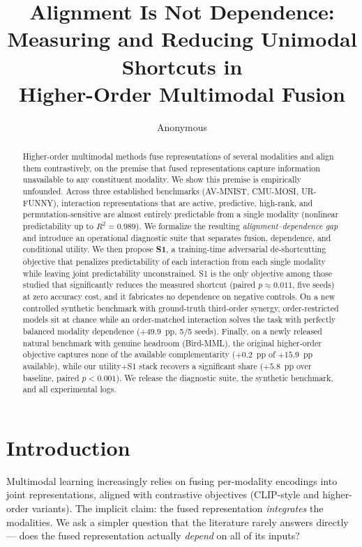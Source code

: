 \documentclass[10pt,twocolumn]{article}
\title{Alignment Is Not Dependence:\\Measuring and Reducing Unimodal Shortcuts in\\Higher-Order Multimodal Fusion}
\author{Anonymous}
\date{}
\begin{document}
\maketitle

\begin{abstract}
Higher-order multimodal methods fuse representations of several modalities and align them
contrastively, on the premise that fused representations capture information unavailable to any
constituent modality. We show this premise is empirically unfounded. Across three established
benchmarks (AV-MNIST, CMU-MOSI, UR-FUNNY), interaction representations that are active,
predictive, high-rank, and permutation-sensitive are almost entirely predictable from a single
modality (nonlinear predictability up to $R^2=0.989$). We formalize the resulting
\emph{alignment--dependence gap} and introduce an operational diagnostic suite that separates
fusion, dependence, and conditional utility. We then propose \textbf{S1}, a training-time
adversarial de-shortcutting objective that penalizes predictability of each interaction from each
single modality while leaving joint predictability unconstrained. S1 is the only objective among
those studied that significantly reduces the measured shortcut (paired $p\approx0.011$, five
seeds) at zero accuracy cost, and it fabricates no dependence on negative controls. On a new
controlled synthetic benchmark with ground-truth third-order synergy, order-restricted models sit
at chance while an order-matched interaction solves the task with perfectly balanced modality
dependence ($+49.9$~pp, 5/5 seeds). Finally, on a newly released natural benchmark with genuine
headroom (Bird-MML), the original higher-order objective captures none of the available
complementarity ($+0.2$~pp of $+15.9$~pp available), while our utility+S1 stack recovers a
significant share ($+5.8$~pp over baseline, paired $p<0.001$).
We release the diagnostic suite, the synthetic benchmark, and all experimental logs.
\end{abstract}

\section{Introduction}
Multimodal learning increasingly relies on fusing per-modality encodings into joint
representations, aligned with contrastive objectives (CLIP-style and higher-order variants).
The implicit claim: the fused representation \emph{integrates} the modalities. We ask a simpler
question that the literature rarely answers directly --- does the fused representation actually
\emph{depend} on all of its inputs?
\end{document}
